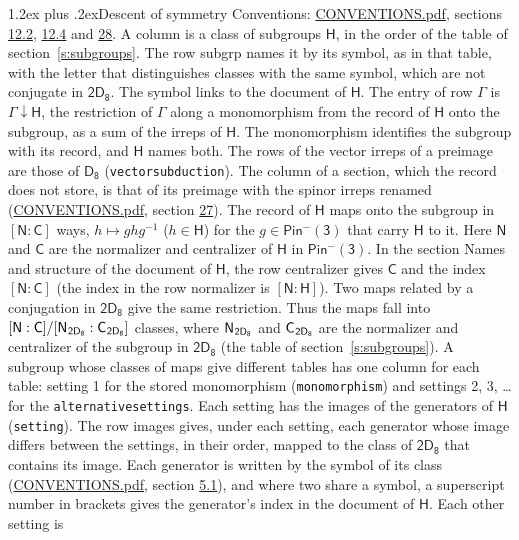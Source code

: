 \documentclass[10pt,a4paper]{article}
\makeatletter
\renewcommand\section{\@startsection{section}{1}{\z@}{-3ex plus -1ex minus -.2ex}%
  {1.2ex plus .2ex}{\normalfont\large\sffamily\bfseries\color{parttitle}}}
\numberwithin{equation}{section}
\newcommand{\grp}[1]{\mathsf{#1}}
\newcommand{\grpindex}[2]{[#1 : #2]}
\newcommand{\restr}[2]{#1\!\downarrow#2}
\newcommand{\hairsp}{\mkern1mu}
\makeatother
\begin{document}
\section{Descent of symmetry}\label{s:subduction}
Conventions: \href{../../CONVENTIONS.pdf}{CONVENTIONS.pdf}, sections \href{../../../rotation/CONVENTIONS.pdf\#conv.12.2}{12.2}, \href{../../../rotation/CONVENTIONS.pdf\#conv.12.4}{12.4} and \href{../../CONVENTIONS.pdf\#conv.28}{28}.
A column is a class of subgroups $\grp{H}$, in the order of the table of section~\ref{s:subgroups}. The row subgrp names it by its symbol, as in that table, with the letter that distinguishes classes with the same symbol, which are not conjugate in $\grp{2D_{8}}$. The symbol links to the document of $\grp{H}$. The entry of row $\Gamma$ is $\restr{\Gamma}{\grp{H}}$, the restriction of $\Gamma$ along a monomorphism from the record of $\grp{H}$ onto the subgroup, as a sum of the irreps of $\grp{H}$. The monomorphism identifies the subgroup with its record, and $\grp{H}$ names both. The rows of the vector irreps of a preimage are those of \href{../../../rotation/data/pdf/D8.pdf}{$\grp{D_{8}}$} (\texttt{vectorsubduction}). The column of a section, which the record does not store, is that of its preimage with the spinor irreps renamed (\href{../../CONVENTIONS.pdf}{CONVENTIONS.pdf}, section \href{../../CONVENTIONS.pdf\#conv.27}{27}). \label{n:group.normalizer.o3}\label{n:group.centralizer.o3}\label{n:element.h}The record of $\grp{H}$ maps onto the subgroup in $\grpindex{\grp{N}}{\grp{C}}$ ways, $h \mapsto g h g^{-1}$ ($h \in \grp{H}$) for the $g \in \grp{Pin^{-}(3)}$ that carry $\grp{H}$ to it. Here $\grp{N}$ and $\grp{C}$ are the normalizer and centralizer of $\grp{H}$ in \href{Pinminus3.pdf}{$\grp{Pin^{-}(3)}$}. In the section Names and structure of the document of $\grp{H}$, the row centralizer gives $\grp{C}$ and the index $\grpindex{\grp{N}}{\grp{C}}$ (the index in the row normalizer is $\grpindex{\grp{N}}{\grp{H}}$). Two maps related by a conjugation in $\grp{2D_{8}}$ give the same restriction. Thus the maps fall into $\grpindex{\grp{N}}{\grp{C}}/\grpindex{\grp{N}_{\hairsp \grp{2D_{8}}}}{\grp{C}_{\hairsp \grp{2D_{8}}}}$ classes, where $\grp{N}_{\hairsp \grp{2D_{8}}}$ and $\grp{C}_{\hairsp \grp{2D_{8}}}$ are the normalizer and centralizer of the subgroup in $\grp{2D_{8}}$ (the table of section~\ref{s:subgroups}). \label{n:head.setting}A subgroup whose classes of maps give different tables has one column for each table: setting 1 for the stored monomorphism (\texttt{monomorphism}) and settings 2, 3, \dots{} for the \texttt{alternativesettings}. Each setting has the images of the generators of $\grp{H}$ (\texttt{setting}). \label{n:head.images}The row images gives, under each setting, each generator whose image differs between the settings, in their order, mapped to the class of $\grp{2D_{8}}$ that contains its image. \label{n:element.generator.index}Each generator is written by the symbol of its class (\href{../../CONVENTIONS.pdf}{CONVENTIONS.pdf}, section \href{../../../rotation/CONVENTIONS.pdf\#conv.5.1}{5.1}), and where two share a symbol, a superscript number in brackets gives the generator's index in the document of $\grp{H}$. \label{n:irrep.Delta}Each other setting is 
\end{document}
